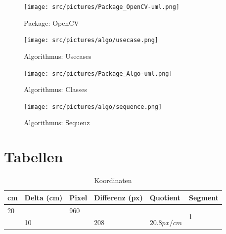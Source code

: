 \begin{appendix}
        \begin{figure}[ht]
            \centering
            \texttt{[image: src/pictures/Package\_OpenCV-uml.png]}
            \caption{Package: OpenCV}
            \label{img:package:ocv}
        \end{figure}

        \cleardoubleemptypage

        \begin{figure}[ht]
            \centering
            \texttt{[image: src/pictures/algo/usecase.png]}
            \caption{Algorithmus: Usecases}
            \label{img:algo:usecases}
        \end{figure}

        \cleardoubleemptypage

        \begin{figure}[ht]
            \centering
            \texttt{[image: src/pictures/Package\_Algo-uml.png]}
            \caption{Algorithmus: Classes}
            \label{img:algo:classes}
        \end{figure}

        \cleardoubleemptypage

        \begin{figure}[ht]
            \centering
            \texttt{[image: src/pictures/algo/sequence.png]}
            \caption{Algorithmus: Sequenz}
            \label{img:algo:sequence}
        \end{figure}

    \chapter{Tabellen}

        \begin{table}[h]
            \caption{Koordinaten}
            \label{tbl:cmtbl}
            \begin{center}
                \begin{tabular}[]{| l | l | l | l | l | l |}
                    \hline
                    cm      & Delta (cm) & Pixel & Differenz (px) & Quotient     & Segment \\

                    \hline

                    20      &            & 960   &                &              & \multirow{2}{1cm}{1} \\
                            & 10         &       & 208            & $20.8 px/cm$ & \\
                    \hline


\end{tabular}
\end{center}
\end{table}
\end{appendix}

